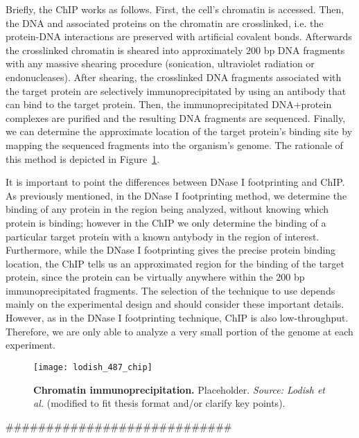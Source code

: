 Briefly, the ChIP works as follows. First, the cell's chromatin is accessed. Then, the DNA and associated proteins on the chromatin are crosslinked, i.e. the protein-DNA interactions are preserved with artificial covalent bonds. Afterwards the crosslinked chromatin is sheared into approximately $200$ bp DNA fragments with any massive shearing procedure (sonication, ultraviolet radiation or endonucleases). After shearing, the crosslinked DNA fragments associated with the target protein are selectively immunoprecipitated by using an antibody that can bind to the target protein. Then, the immunoprecipitated DNA$+$protein complexes are purified and the resulting DNA fragments are sequenced. Finally, we can determine the approximate location of the target protein's binding site by mapping the sequenced fragments into the organism's genome. The rationale of this method is depicted in Figure~\ref{fig:lodish_chip}.

It is important to point the differences between DNase I footprinting and ChIP. As previously mentioned, in the DNase I footprinting method, we determine the binding of any protein in the region being analyzed, without knowing which protein is binding; however in the ChIP we only determine the binding of a particular target protein with a known antybody in the region of interest. Furthermore, while the DNase I footprinting gives the precise protein binding location, the ChIP tells us an approximated region for the binding of the target protein, since the protein can be virtually anywhere within the \approxy$200$ bp immunoprecipitated fragments. The selection of the technique to use depends mainly on the experimental design and should consider these important details. However, as in the DNase I footprinting technique, ChIP is also low-throughput. Therefore, we are only able to analyze a very small portion of the genome at each experiment.

\begin{figure}[h!]
\centering
\texttt{[image: lodish\_487\_chip]}
\caption[Chromatin immunoprecipitation]{\textbf{Chromatin immunoprecipitation.} Placeholder. \emph{Source: Lodish et al.}\cite{lodish2007} (modified to fit thesis format and/or clarify key points).}
\label{fig:lodish_chip}
\end{figure}




############################




